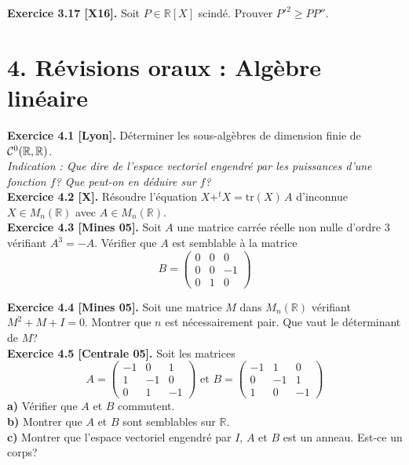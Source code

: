 \documentclass[a4paper,12pt,francais]{article}
\newcommand{\field}[1]{\mathbb{#1}}
\newcommand{\R}{\field{R}}
\newcommand{\tr}{\mbox{tr}}
\begin{document}
\noindent
{\bf Exercice 3.17 [X16].} %
Soit $P \in \R[X]$ scindé. Prouver $P'^2 \geqslant P P''$.\\


\newpage
\section*{4. Révisions oraux : Algèbre linéaire} %

\noindent
{\bf Exercice 4.1 [Lyon].} Déterminer les sous-algèbres de dimension
finie de ${\cal{C}}^0(\R,\R)$.\\ 
{\it Indication : Que dire de l'espace vectoriel engendré par les
  puissances d'une fonction $f$? Que peut-on en déduire sur $f$?}\\

\noindent
{\bf Exercice 4.2 [X].} Résoudre l'équation $X+^tX=\tr
(X)
\, A$ d'inconnue $X \in M_n(\R)$ avec $A \in M_n(\R)$.\\
 
\noindent
{\bf Exercice 4.3 [Mines 05].} Soit $A$ une matrice carrée réelle non
nulle d'ordre $3$ vérifiant $A^3=-A$. Vérifier que $A$ est semblable à
la matrice
$$B=\left( {
\begin{array}{ccc}
0&0&0\\
0&0&-1\\
0&1&0
\end{array}} \right)$$

\noindent
{\bf Exercice 4.4 [Mines 05].} Soit une matrice $M$ dans $M_n(\R)$
vérifiant $M^2+M+I=0$. Montrer que $n$ est nécessairement pair. Que
vaut le déterminant de $M$?\\

\noindent
{\bf Exercice 4.5 [Centrale 05].} Soit les matrices 
$$A=\left({
\begin{array}{ccc}
-1&0&1\\
1&-1&0\\
0&1&-1
\end{array}
}\right)
\mbox{ et }
B=\left( {
\begin{array}{ccc}
-1&1&0\\
0&-1&1\\
1&0&-1
\end{array}
} \right)$$
\indent
{\bf a)} Vérifier que $A$ et $B$ commutent.\\
\indent
{\bf b)} Montrer que $A$ et $B$ sont semblables sur $\R$.\\
\indent
{\bf c)} Montrer que l'espace vectoriel engendré par $I$, $A$ et $B$
est un anneau. Est-ce un corps?\\
\end{document}
